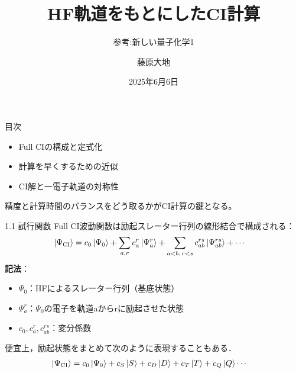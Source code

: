\documentclass{beamer}
\title{HF軌道をもとにしたCI計算
}
\subtitle{参考:新しい量子化学1}
\author{藤原大地}
\date{2025年6月6日}
\begin{document}
\frame{\titlepage}

\begin{frame}{目次}

  
  \begin{itemize}
    \item Full CIの構成と定式化
    \item 計算を早くするための近似
    \item CI解と一電子軌道の対称性
  \end{itemize}
  
  \vspace{1em}
  精度と計算時間のバランスをどう取るかがCI計算の鍵となる。
  \end{frame}

\begin{frame}{1.1 試行関数}
  Full CI波動関数は励起スレーター行列の線形結合で構成される：
  \begin{align*}
  \ket{\Psi_{\mathrm{CI}}} &= c_0 \ket{\Psi_0} + \sum_{a, r} c_a^r \ket{\Psi_a^r} + \sum_{a < b,\, r < s} c_{ab}^{rs} \ket{\Psi_{ab}^{rs}} + \cdots
  \end{align*}
  \textbf{記法}：
  \begin{itemize}
    \item $\Psi_0$：HFによるスレーター行列（基底状態）
    \item $\Psi_a^r$：$\Psi_0$の電子を軌道aからrに励起させた状態
    \item $c_0, c_a^r, c_{ab}^{rs}$：変分係数
  \end{itemize}
便宜上，励起状態をまとめて次のように表現することもある．
  \begin{align*}
    \ket{\Psi_{\mathrm{CI}}} &= c_0 \ket{\Psi_0} + c_S \ket{S} +  c_D \ket{D} + c_T \ket{T} +c_Q\ket{Q} \cdots
  \end{align*}
\end{frame}
\end{document}
